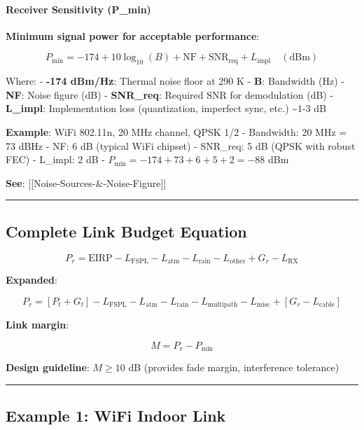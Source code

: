 \paragraph{Receiver Sensitivity
(P\_min)}\label{receiver-sensitivity-p_min}

\textbf{Minimum signal power for acceptable performance}:

\[
P_{\text{min}} = -174 + 10\log_{10}(B) + \text{NF} + \text{SNR}_{\text{req}} + L_{\text{impl}} \quad (\text{dBm})
\]

Where: - \textbf{-174 dBm/Hz}: Thermal noise floor at 290 K -
\textbf{B}: Bandwidth (Hz) - \textbf{NF}: Noise figure (dB) -
\textbf{SNR\_req}: Required SNR for demodulation (dB) -
\textbf{L\_impl}: Implementation loss (quantization, imperfect sync,
etc.) \textasciitilde1-3 dB

\textbf{Example}: WiFi 802.11n, 20 MHz channel, QPSK 1/2 - Bandwidth: 20
MHz = 73 dBHz - NF: 6 dB (typical WiFi chipset) - SNR\_req: 5 dB (QPSK
with robust FEC) - L\_impl: 2 dB -
\(P_{\text{min}} = -174 + 73 + 6 + 5 + 2 = -88\) dBm

\textbf{See}: {[}{[}Noise-Sources-\&-Noise-Figure{]}{]}

\begin{center}\rule{0.5\linewidth}{0.5pt}\end{center}

\subsection{Complete Link Budget
Equation}\label{complete-link-budget-equation}

\[
P_r = \text{EIRP} - L_{\text{FSPL}} - L_{\text{atm}} - L_{\text{rain}} - L_{\text{other}} + G_r - L_{\text{RX}}
\]

\textbf{Expanded}:

\[
P_r = [P_t + G_t] - L_{\text{FSPL}} - L_{\text{atm}} - L_{\text{rain}} - L_{\text{multipath}} - L_{\text{misc}} + [G_r - L_{\text{cable}}]
\]

\textbf{Link margin}:

\[
M = P_r - P_{\text{min}}
\]

\textbf{Design guideline}: \(M \geq 10\) dB (provides fade margin,
interference tolerance)

\begin{center}\rule{0.5\linewidth}{0.5pt}\end{center}

\subsection{Example 1: WiFi Indoor
Link}\label{example-1-wifi-indoor-link}


